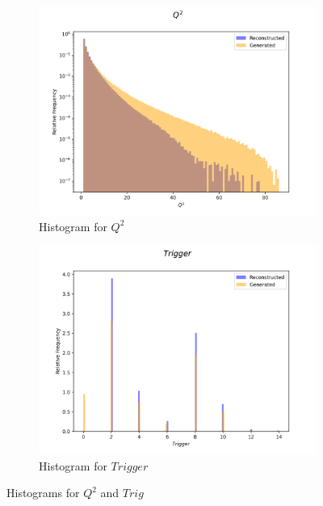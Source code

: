 \documentclass{article}
\begin{document}
\begin{figure}[H]
    \centering
    \begin{subfigure}[b]{0.45\textwidth}
        \includegraphics[width=\textwidth]{graphs/incl_Q2.png}
        \caption{Histogram for $Q^2$}
        \label{fig:incl_Q2}
    \end{subfigure}
    \hfill
    \begin{subfigure}[b]{0.45\textwidth}
        \includegraphics[width=\textwidth]{graphs/incl_Trigger.png}
        \caption{Histogram for $Trigger$}
        \label{fig:incl_Trig}
    \end{subfigure}
    \caption{Histograms for $Q^2$ and $Trig$}
\end{figure}
\end{document}
